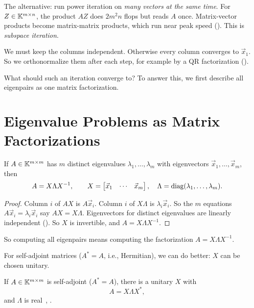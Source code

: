 The alternative: run power iteration on \emph{many vectors at the same time}. For $Z \in \mathbb{K}^{m \times n}$, the product $AZ$ does $2m^2n$ flops but reads $A$ once. Matrix-vector products become matrix-matrix products, which run near peak speed (). This is \emph{subspace iteration}.

We must keep the columns independent. Otherwise every column converges to $\vec{x}_1$. So we orthonormalize them after each step, for example by a QR factorization ().

What should such an iteration converge to? To answer this, we first describe all eigenpairs as one matrix factorization.

\section{Eigenvalue Problems as Matrix Factorizations}
\label{sec:eig-factorization}

\begin{proposition}
  \label{prop:distinct-diag}
  If $A \in \mathbb{K}^{m \times m}$ has $m$ distinct eigenvalues $\lambda_1, \dots, \lambda_m$ with eigenvectors $\vec{x}_1, \dots, \vec{x}_m$, then
  \begin{equation}
    A = X\Lambda X^{-1}, \qquad X = \begin{bmatrix} \vec{x}_1 & \cdots & \vec{x}_m \end{bmatrix}, \quad \Lambda = \operatorname{diag}(\lambda_1, \dots, \lambda_m).
  \end{equation}
\end{proposition}

\begin{proof}
  Column $i$ of $AX$ is $A\vec{x}_i$. Column $i$ of $X\Lambda$ is $\lambda_i\vec{x}_i$. So the $m$ equations $A\vec{x}_i = \lambda_i\vec{x}_i$ say $AX = X\Lambda$. Eigenvectors for distinct eigenvalues are linearly independent (). So $X$ is invertible, and $A = X\Lambda X^{-1}$.
\end{proof}

So computing all eigenpairs means computing the factorization $A = X\Lambda X^{-1}$.

For self-adjoint matrices ($A^\ast = A$, i.e., Hermitian), we can do better: $X$ can be chosen unitary.

\begin{theorem}
  \label{thm:spectral}
  If $A \in \mathbb{K}^{m \times m}$ is self-adjoint ($A^\ast = A$), there is a unitary $X$ with
  \begin{equation}
    A = X\Lambda X^\ast,
  \end{equation}
  and $\Lambda$ is real~\cite[Thm.~24.7]{TB}, \cite[7.29, 7.31]{Axler}.
\end{theorem}

